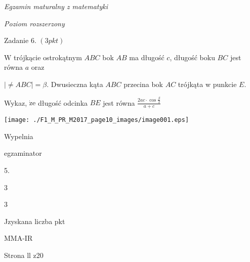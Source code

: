 \documentclass[a4paper,12pt]{article}
\begin{document}
{\it Egzamin maturalny z matematyki}

{\it Poziom rozszerzony}

Zadanie 6. $(3pkt)$

$\mathrm{W}$ trójkącie ostrokątnym $ABC$ bok $AB$ ma długość $c$, długość boku $BC$ jest równa $a$ oraz

$|\neq ABC|=\beta$. Dwusieczna kąta $ABC$ przecina bok $AC$ trójkąta w punkcie $E.$

Wykaz, $\dot{\mathrm{z}}\mathrm{e}$ długość odcinka $BE$ jest równa $\displaystyle \frac{2ac\cdot\cos\frac{\beta}{2}}{a+c}$
\begin{center}
\texttt{[image: ./F1\_M\_PR\_M2017\_page10\_images/image001.eps]}
\end{center}
Wypelnia

egzaminator

5.

3

3

Jzyskana liczba pkt

MMA-IR

Strona ll z20
\end{document}

